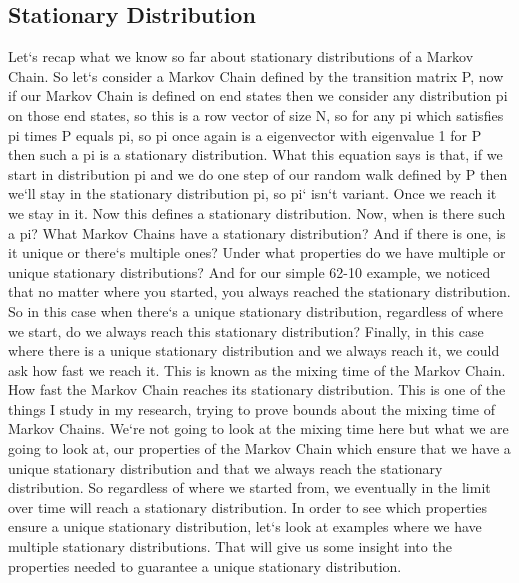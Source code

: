 \subsection{Stationary Distribution}
Let`s recap what we know so far about stationary distributions of a Markov Chain.
So let`s consider a Markov Chain defined by the transition matrix P, now if our Markov Chain is defined on end states then we consider any distribution pi on those end states, so this is a row vector of size N, so for any pi which satisfies pi times P equals pi, so pi once again is a eigenvector with eigenvalue 1 for P then such a pi is a stationary distribution.
What this equation says is that, if we start in distribution pi and we do one step of our random walk defined by P then we`ll stay in the stationary distribution pi, so pi` isn`t variant.
Once we reach it we stay in it.
Now this defines a stationary distribution.
Now, when is there such a pi? What Markov Chains have a stationary distribution? And if there is one, is it unique or there`s multiple ones? Under what properties do we have multiple or unique stationary distributions? And for our simple 62-10 example, we noticed that no matter where you started, you always reached the stationary distribution.
So in this case when there`s a unique stationary distribution, regardless of where we start, do we always reach this stationary distribution? Finally, in this case where there is a unique stationary distribution and we always reach it, we could ask how fast we reach it.
This is known as the mixing time of the Markov Chain.
How fast the Markov Chain reaches its stationary distribution.
This is one of the things I study in my research, trying to prove bounds about the mixing time of Markov Chains.
We`re not going to look at the mixing time here but what we are going to look at, our properties of the Markov Chain which ensure that we have a unique stationary distribution and that we always reach the stationary distribution.
So regardless of where we started from, we eventually in the limit over time will reach a stationary distribution.
In order to see which properties ensure a unique stationary distribution, let`s look at examples where we have multiple stationary distributions.
That will give us some insight into the properties needed to guarantee a unique stationary distribution.

